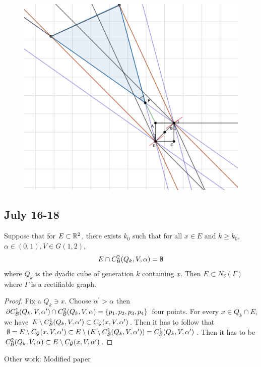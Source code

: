 \begin{figure}[H]
    \centering
    \includegraphics[width=.66\textwidth]{images/newlemma1.png}
\end{figure}


\newpage
\subsection{July 16-18}
\begin{lemma}
    Suppose that for $E\subset \mathbb{R}^2$, there exists $k_0$ such that for all $x\in E$ and $k\geq k_0$, $\alpha\in(0,1), V\in G(1,2)$,
    \begin{equation*}
        E\cap C_\mathcal B^2(Q_k, V, \alpha) = \emptyset
    \end{equation*}
    where $Q_k$ is the dyadic cube of generation $k$ containing $x$. Then $E\subset N_\delta(\Gamma)$ where $\Gamma$ is a rectifiable graph. 
\end{lemma}

\begin{proof}
    Fix a $Q_k\ni x$. Choose $\alpha^\prime>\alpha$ then $\partial C_\mathcal B^1(Q_k, V, \alpha^\prime) \cap C_\mathcal B^2(Q_k, V, \alpha) = \{p_1, p_2, p_3, p_4\}$ four points. For every $x\in Q_k\cap E$, we have $E\setminus C_\mathcal B^1(Q_k, V, \alpha^\prime)\subset C_\mathcal G(x, V, \alpha^\prime)$. Then it has to follow that $\emptyset = E\setminus C_\mathcal G(x, V, \alpha^\prime) \subset E\setminus (E\setminus C_\mathcal B^1 (Q_k, V, \alpha^\prime)) = C_\mathcal B^1 (Q_k, V, \alpha^\prime)$. Then it has to be $C_\mathcal B^2 (Q_k, V, \alpha) \subset E\setminus C_\mathcal G(x, V, \alpha^\prime)$.
\end{proof}



Other work: Modified paper



